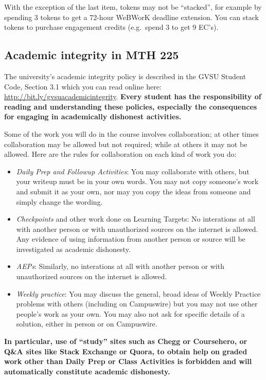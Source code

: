 \documentclass[]{article}
\providecommand{\tightlist}{%
  \setlength{\itemsep}{0pt}\setlength{\parskip}{0pt}}
\begin{document}
With the exception of the last item, tokens may not be ``stacked'', for
example by spending 3 tokens to get a 72-hour WeBWorK deadline
extension. You can stack tokens to purchase engagement credits
(e.g.~spend 3 to get 9 EC's).

\hypertarget{academic-integrity-in-mth-225}{%
\subsection{Academic integrity in MTH
225}\label{academic-integrity-in-mth-225}}

The university's academic integrity policy is described in the GVSU
Student Code, Section 3.1 which you can read online here:
\url{http://bit.ly/gvsuacademicintegrity}. \textbf{Every student has the
responsibility of reading and understanding these policies, especially
the consequences for engaging in academically dishonest activities.}

Some of the work you will do in the course involves collaboration; at
other times collaboration may be allowed but not required; while at
others it may not be allowed. Here are the rules for collaboration on
each kind of work you do:

\begin{itemize}
\tightlist
\item
  \emph{Daily Prep and Followup Activities}: You may collaborate with
  others, but your writeup must be in your own words. You may not copy
  someone's work and submit it as your own, nor may you copy the ideas
  from someone and simply change the wording.
\item
  \emph{Checkpoints} and other work done on Learning Targets: No
  interations at all with another person or with unauthorized sources on
  the internet is allowed. Any evidence of using information from
  another person or source will be investigated as academic dishonesty.
\item
  \emph{AEPs}: Similarly, no interations at all with another person or
  with unauthorized sources on the internet is allowed.
\item
  \emph{Weekly practice}: You may discuss the general, broad ideas of
  Weekly Practice problems with others (including on Campuswire) but you
  may not use other people's work as your own. You may also not ask for
  specific details of a solution, either in person or on Campuswire.
\end{itemize}

\textbf{In particular, use of ``study'' sites such as Chegg or
Coursehero, or Q\&A sites like Stack Exchange or Quora, to obtain help
on graded work other than Daily Prep or Class Activities is forbidden
and will automatically constitute academic dishonesty.}
\end{document}
